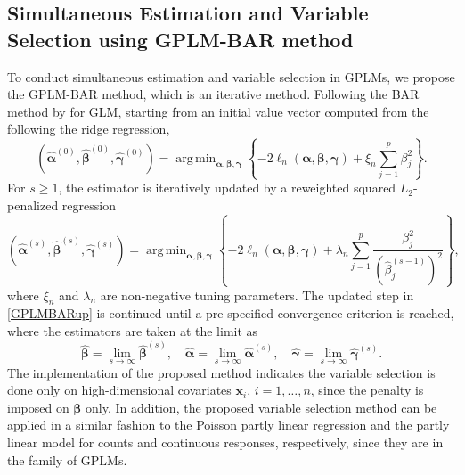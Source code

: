 \documentclass[11pt]{article}
\DeclareMathOperator*{\argmin}{arg\,min}
\begin{document}
\subsection{Simultaneous Estimation and Variable Selection using GPLM-BAR method}
To conduct simultaneous estimation and variable selection in GPLMs, we propose the GPLM-BAR method, which is an iterative method. Following the BAR method by \citet{li2021scalable} for GLM, starting from an initial value vector  computed from the following 
the ridge regression,
\begin{equation}\label{GPLMBARinit}
\left(\widehat{\boldsymbol{\alpha}}^{(0)},\widehat{\boldsymbol{\beta}}^{(0)},\widehat{\boldsymbol{\gamma}}^{(0)}\right) = \argmin_{\boldsymbol{\alpha},\boldsymbol{\beta},\boldsymbol{\gamma}} \left\{-2\ell_n(\boldsymbol{\alpha}, \boldsymbol{\beta},\boldsymbol{\gamma}) + \xi_n \sum^p_{j=1} \beta^2_j \right\}.
\end{equation}
For $s \geq 1$, the estimator is iteratively updated by a reweighted squared $L_2$-penalized regression
\begin{equation}\label{GPLMBARup}
\left(\widehat{\boldsymbol{\alpha}}^{(s)},\widehat{\boldsymbol{\beta}}^{(s)},\widehat{\boldsymbol{\gamma}}^{(s)} \right) = \argmin_{\boldsymbol{\alpha}, \boldsymbol{\beta},\boldsymbol{\gamma}} \left\{-2 \ell_n(\boldsymbol{\alpha}, \boldsymbol{\beta},\boldsymbol{\gamma}) + \lambda_n \sum^p_{j=1} \frac{\beta^2_j}{(\widehat{\beta}^{(s-1)}_j)^2} \right\},
\end{equation}
where $\xi_n$ and $\lambda_n$ are non-negative tuning parameters. The updated step in \eqref{GPLMBARup} is continued until a pre-specified convergence criterion is reached, where the estimators are taken at the limit as
$$
\widehat{\boldsymbol{\beta}} = \lim_{s \rightarrow \infty} \widehat{\boldsymbol{\beta}}^{(s)}, \quad \widehat{\boldsymbol{\alpha}} =  \lim_{s \rightarrow \infty} \widehat{\boldsymbol{\alpha}}^{(s)}, \quad \widehat{\boldsymbol{\gamma}} =  \lim_{s \rightarrow \infty} \widehat{\boldsymbol{\gamma}}^{(s)}.
$$
The implementation of the proposed method indicates the variable selection is done only on high-dimensional covariates $\textbf{x}_i$, $i=1,\ldots,n$, since the penalty is imposed on $\boldsymbol{\beta}$ only. In addition, the proposed variable selection method can be applied in a similar fashion to  the  Poisson  partly linear regression and the partly linear model for counts and continuous responses, respectively, since they are in the family of GPLMs.  
\end{document}
